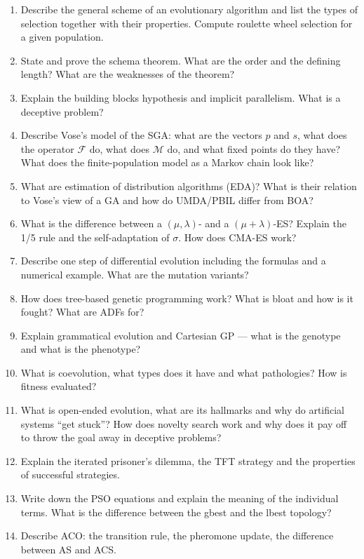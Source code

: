 \documentclass[11pt,a4paper]{article}
\theoremstyle{definition}
\providecommand{\uv}[1]{``#1''}
\begin{document}
\begin{enumerate}
\item Describe the general scheme of an evolutionary algorithm and list the
  types of selection together with their properties. Compute roulette wheel
  selection for a given population.
\item State and prove the schema theorem. What are the order and the defining
  length? What are the weaknesses of the theorem?
\item Explain the building blocks hypothesis and implicit parallelism.
  What is a deceptive problem?
\item Describe Vose's model of the SGA: what are the vectors $p$ and $s$, what
  does the operator $\mathcal{F}$ do, what does $\mathcal{M}$ do, and what fixed
  points do they have? What does the finite-population model as a Markov chain
  look like?
\item What are estimation of distribution algorithms (EDA)? What is their
  relation to Vose's view of a GA and how do UMDA/PBIL differ from BOA?
\item What is the difference between a $(\mu,\lambda)$- and a
  $(\mu+\lambda)$-ES? Explain the 1/5 rule and the self-adaptation of $\sigma$.
  How does CMA-ES work?
\item Describe one step of differential evolution including the formulas and a
  numerical example. What are the mutation variants?
\item How does tree-based genetic programming work? What is bloat and how is it
  fought? What are ADFs for?
\item Explain grammatical evolution and Cartesian GP --- what is the genotype
  and what is the phenotype?
\item What is coevolution, what types does it have and what pathologies? How is
  fitness evaluated?
\item What is open-ended evolution, what are its hallmarks and why do artificial
  systems \uv{get stuck}? How does novelty search work and why does it pay off
  to throw the goal away in deceptive problems?
\item Explain the iterated prisoner's dilemma, the TFT strategy and the
  properties of successful strategies.
\item Write down the PSO equations and explain the meaning of the individual
  terms. What is the difference between the gbest and the lbest topology?
\item Describe ACO: the transition rule, the pheromone update, the difference
  between AS and ACS.

\end{enumerate}
\end{document}
